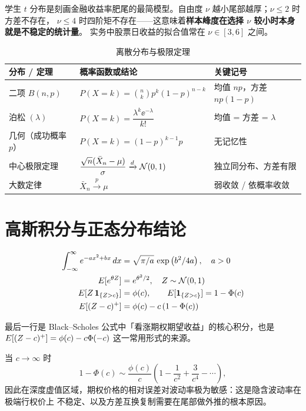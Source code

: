 \begin{notebox}[关于 t 分布与金融收益]
学生 $t$ 分布是刻画金融收益率肥尾的最简模型。自由度 $\nu$ 越小尾部越厚；$\nu\le 2$ 时方差不存在，
$\nu\le 4$ 时四阶矩不存在——这意味着\textbf{样本峰度在选择 $\nu$ 较小时本身就是不稳定的统计量}。
实务中股票日收益的拟合值常在 $\nu\in[3,6]$ 之间。
\end{notebox}

\begin{table}[htbp]
\centering
\caption{离散分布与极限定理}\label{tab:dist-disc}
\tablefont
\begin{tabularx}{\textwidth}{@{}L{2.6cm}Y L{2.6cm}@{}}
\toprule
\textbf{分布 / 定理} & \textbf{概率函数或结论} & \textbf{关键记号} \\
\midrule
二项 $B(n,p)$ & $P(X=k)=\binom{n}{k}p^k(1-p)^{n-k}$ & 均值 $np$，方差 $np(1-p)$ \\
泊松 $(\lambda)$ & $P(X=k)=\dfrac{\lambda^k \ee^{-\lambda}}{k!}$ & 均值 = 方差 = $\lambda$ \\
几何（成功概率 $p$） & $P(X=k)=(1-p)^{k-1}p$ & 无记忆性 \\
中心极限定理 & $\dfrac{\sqrt{n}(\bar X_n-\mu)}{\sigma}\xrightarrow{d}\mathcal{N}(0,1)$ & 独立同分布、方差有限 \\
大数定律 & $\bar X_n \xrightarrow{p} \mu$ & 弱收敛 / 依概率收敛 \\
\bottomrule
\end{tabularx}
\end{table}

\section{高斯积分与正态分布结论}

\begin{align}
  \int_{-\infty}^{\infty} e^{-ax^2+bx}\,d x &= \sqrt{\pi/a}\,\exp\left(b^2/4a\right), \quad a>0 \\
  E[e^{\theta Z}] &= e^{\theta^2/2}, \quad Z\sim\mathcal{N}(0,1) \\
  E[Z\,\mathbf{1}_{\{Z>c\}}] &= \phi(c), \qquad E[\mathbf{1}_{\{Z>c\}}] = 1-\Phi(c) \\
  E[(Z-c)^+] &= \phi(c) - c\,(1-\Phi(c))
\end{align}

最后一行是 Black--Scholes 公式中「看涨期权期望收益」的核心积分，也是
$E[(Z-c)^+] = \phi(c)-c\Phi(-c)$ 这一常用形式的来源。

\begin{keybox}
当 $c\to\infty$ 时
\[
  1-\Phi(c) \sim \frac{\phi(c)}{c}\left(1-\frac{1}{c^2}+\frac{3}{c^4}-\cdots\right),
\]
因此在深度虚值区域，期权价格的相对误差对波动率极为敏感：这是隐含波动率在极端行权价上
不稳定、以及方差互换复制需要在尾部做外推的根本原因。
\end{keybox}

